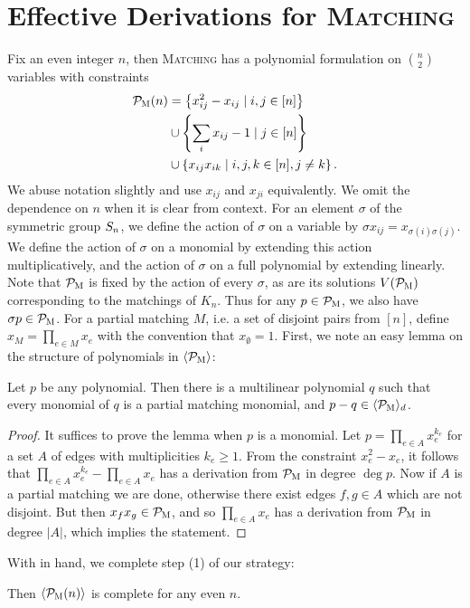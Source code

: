 \section{Effective Derivations for \textsc{Matching}}
Fix an even integer $n$, then \textsc{Matching} has a polynomial formulation on $\binom{n}{2}$ variables with constraints
\begin{align}
\label{eq:matching-formulation}\mathcal P_{\textsc{M}}(n) &= \left\{x_{ij}^2 - x_{ij} \mid i,j \in [n]\right\} \\ &\cup \left\{\sum_i x_{ij} - 1 \mid j \in [n]\right\} \nonumber \\ &\cup \left\{x_{ij}x_{ik} \mid i,j,k \in [n], j\neq k\right\} \nonumber.
\end{align}
We abuse notation slightly and use $x_{ij}$ and $x_{ji}$ equivalently. We omit the dependence on $n$ when it is clear from context. For an element $\sigma$ of the symmetric group $S_{n}$, we define the action of $\sigma$ on a variable by $\sigma x_{ij} = x_{\sigma(i)\sigma(j)}$.
We define the action of $\sigma$ on a monomial by extending this action multiplicatively, and the action of $\sigma$ on a full polynomial by extending linearly.
Note that $\mathcal P_{\textsc{M}}$ is fixed by the action of every $\sigma$, as are its solutions $V(\mathcal P_{\textsc{M}})$ corresponding to the matchings of $K_n$. 
Thus for any $p \in \mathcal P_{\textsc{M}}$, we also have $\sigma p \in \mathcal P_{\textsc{M}}$. For a partial matching $M$, i.e. a set of disjoint pairs from $[n]$, define $x_M = \prod_{e \in M} x_e$ with the convention that $x_{\emptyset} = 1$.
First, we note an easy lemma on the structure of polynomials in $\langle \mathcal P_{\textsc{M}} \rangle$:
\begin{lemma}\label{lem:monomials}
  Let $p$ be any polynomial. Then there is a multilinear polynomial $q$ such that every monomial of $q$ is a partial matching monomial, and $p-q \in \langle \mathcal P_{\textsc{M}} \rangle_d$.
\end{lemma}
\begin{proof}
It suffices to prove the lemma when \(p\) is a monomial. Let
\(p = \prod_{e \in A} x_{e}^{k_{e}}\)
for a set \(A\) of edges with multiplicities \(k_{e} \geq 1\).
From the constraint \(x_{e}^{2} - x_e\), it follows that
$\prod_{e \in A} x_e^{k_e} - \prod_{e \in A} x_e$ has a derivation from $\mathcal P_{\textsc{M}}$ in degree $\deg p$.
Now if $A$ is a partial matching we are done, otherwise there exist edges $f,g \in A$ which are not disjoint.
But then $x_fx_g \in \mathcal P_{\textsc{M}}$, and so $\prod_{e \in A} x_e$ has a derivation from $\mathcal P_{\textsc{M}}$ in degree $|A|$, which implies the statement.
\end{proof}
With  in hand, we complete step (1) of our strategy:
\begin{lemma}\label{lem:matching-complete}
Then $\langle \mathcal P_{\textsc{M}}(n) \rangle$ is complete for any even $n$. 
\end{lemma}
